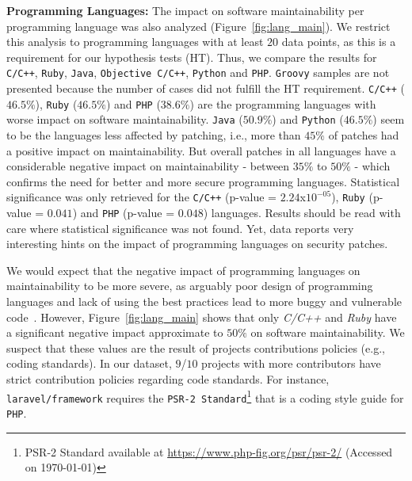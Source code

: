\documentclass[10pt,conference]{IEEEtran}
\begin{document}
\textbf{Programming Languages:} The impact on software maintainability per programming 
language was also analyzed (Figure~\ref{fig:lang_main}). We restrict 
this analysis to programming languages with at least $20$ data points, as this 
is a requirement for our hypothesis tests (HT). Thus, we compare the results for 
\texttt{C/C++}, \texttt{Ruby}, \texttt{Java}, \texttt{Objective C/C++}, 
\texttt{Python} and \texttt{PHP}. \texttt{Groovy} samples are not presented
because the number of cases did not fulfill the HT requirement. 
\texttt{C/C++} ($46.5\%$), \texttt{Ruby} ($46.5\%$) and 
\texttt{PHP} ($38.6\%$) are the programming languages with worse 
impact on software maintainability. \texttt{Java} ($50.9\%$) and \texttt{Python} 
($46.5\%$) seem to be the 
languages less affected by patching, i.e., more than $45\%$ of patches had a positive 
impact on maintainability. But overall patches in all languages have a 
considerable negative impact on maintainability - between $35\%$ to $50\%$ - which 
confirms the need for better and more secure programming languages. 
Statistical significance was only retrieved for the \texttt{C/C++} 
(p-value = $2.24$x$10^{-05}$), \texttt{Ruby} (p-value = $0.041$) and \texttt{PHP} (p-value = $0.048$) languages.
Results should be read with care where statistical significance was not found.
Yet, data reports very interesting hints on the impact of programming languages 
on security patches.

We would expect that the negative impact of programming languages on
maintainability to be more severe, as arguably poor design of programming
languages and lack of using the best practices lead to more buggy and vulnerable
code~\cite{Ray:2017:LSP:3144574.3126905, 2019arXiv190110220B}. However,
Figure~\ref{fig:lang_main} shows that only \emph{C/C++} and \emph{Ruby} have 
a significant negative impact approximate to $50\%$ on software 
maintainability. We suspect that these values are
the result of projects contributions policies (e.g., coding standards). In our dataset, 
$9$/$10$ projects with more contributors have strict contribution 
policies regarding code standards. For
instance, \texttt{laravel/framework} requires the \texttt{PSR-2
Standard}\footnote{PSR-2 Standard available at
\url{https://www.php-fig.org/psr/psr-2/} (Accessed on \today{})} that is a coding style guide for \texttt{PHP}.
\end{document}
